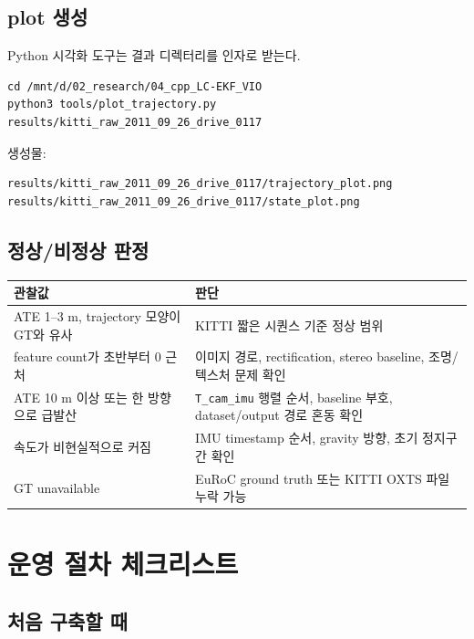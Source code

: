 \documentclass[11pt,a4paper,oneside]{report}
\begin{document}
\section{plot 생성}

Python 시각화 도구는 결과 디렉터리를 인자로 받는다.

\begin{lstlisting}[style=shell,caption={trajectory/state plot 생성}]
cd /mnt/d/02_research/04_cpp_LC-EKF_VIO
python3 tools/plot_trajectory.py results/kitti_raw_2011_09_26_drive_0117
\end{lstlisting}

생성물:

\begin{lstlisting}[style=shell]
results/kitti_raw_2011_09_26_drive_0117/trajectory_plot.png
results/kitti_raw_2011_09_26_drive_0117/state_plot.png
\end{lstlisting}

\section{정상/비정상 판정}

\begin{longtable}{p{}p{}}
\toprule
관찰값 & 판단 \\
\midrule
ATE 1--3 m, trajectory 모양이 GT와 유사 & KITTI 짧은 시퀀스 기준 정상 범위 \\
feature count가 초반부터 0 근처 & 이미지 경로, rectification, stereo baseline, 조명/텍스처 문제 확인 \\
ATE 10 m 이상 또는 한 방향으로 급발산 & \texttt{T\_cam\_imu} 행렬 순서, baseline 부호, dataset/output 경로 혼동 확인 \\
속도가 비현실적으로 커짐 & IMU timestamp 순서, gravity 방향, 초기 정지구간 확인 \\
GT unavailable & EuRoC ground truth 또는 KITTI OXTS 파일 누락 가능 \\
\bottomrule
\end{longtable}

\chapter{운영 절차 체크리스트}

\section{처음 구축할 때}
\end{document}
